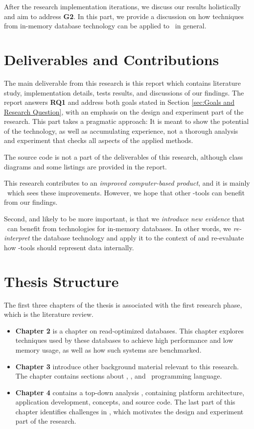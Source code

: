 After the research implementation iterations, we discuss our results holistically and aim to address \textbf{G2}. In this part, we provide a discussion on how techniques from in-memory database technology can be applied to \mde~in general.

\section{Deliverables and Contributions}
\label{sec:Deliverables and Contributions}
The main deliverable from this research is this report which contains literature study, implementation details, tests results, and discussions of our findings. The report answers \textbf{RQ1} and address both goals stated in Section \ref{sec:Goals and Research Question}, with an emphasis on the design and experiment part of the research. This part takes a pragmatic approach: It is meant to show the potential of the technology, as well as accumulating experience, not a thorough analysis and experiment that checks all aspects of the applied methods. 

The source code is not a part of the deliverables of this research, although class diagrams and some listings are provided in the report.

This research contributes to an \textit{improved computer-based product}, and it is mainly \gap~which sees these improvements. However, we hope that other \mde-tools can benefit from our findings. 

Second, and likely to be more important, is that we \textit{introduce new evidence} that \mde~can benefit from technologies for in-memory databases. In other words, we \textit{re-interpret} the database technology and apply it to the context of \mde and re-evaluate how \mdd-tools should represent data internally.


\section{Thesis Structure}
\label{sec:Thesis Structure}
The first three chapters of the thesis is associated with the first research phase, which is the literature review.
\begin{itemize}
  \item \textbf{Chapter 2} is a chapter on read-optimized databases. This chapter explores techniques used by these databases to achieve high performance and low memory usage, as well as how such systems are benchmarked. 
  \item \textbf{Chapter 3} introduce other background material relevant to this research. The chapter contains sections about \mde, \bd, and \delphi~programming language.
  \item \textbf{Chapter 4} contains a top-down analysis \gap, containing platform architecture, application development, concepts, and source code. The last part of this chapter identifies challenges in \gap, which motivates the design and experiment part of the research.
\end{itemize}

